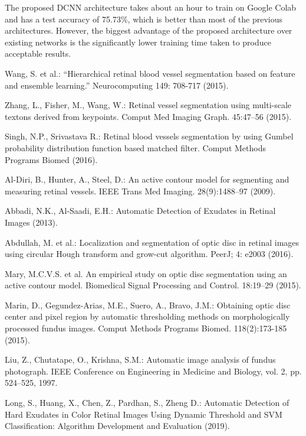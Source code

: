 \documentclass{svproc}
\begin{document}
The proposed DCNN architecture takes about an hour to train on Google Colab and has a test accuracy of 75.73\%, which is better than most of the previous architectures. However, the biggest advantage of the proposed architecture over existing networks is the significantly lower training time taken to produce acceptable results.


\begin{thebibliography}{6}


Wang, S. et al.: “Hierarchical retinal blood vessel segmentation based on feature and ensemble learning.” Neurocomputing 149: 708-717 (2015).

Zhang, L., Fisher, M., Wang, W.: Retinal vessel segmentation using multi-scale textons derived from keypoints. Comput Med Imaging Graph. 45:47–56 (2015).

Singh, N.P., Srivastava R.: Retinal blood vessels segmentation by using Gumbel probability distribution function based matched filter. Comput Methods Programs Biomed (2016).

Al-Diri, B., Hunter, A., Steel, D.: An active contour model for segmenting and measuring retinal vessels. IEEE Trans Med Imaging. 28(9):1488–97 (2009).

Abbadi, N.K., Al-Saadi, E.H.: Automatic Detection of Exudates in Retinal Images (2013).

Abdullah, M. et al.: Localization and segmentation of optic disc in retinal images using circular Hough transform and grow-cut algorithm. PeerJ; 4: e2003 (2016).

Mary, M.C.V.S. et al. An empirical study on optic disc segmentation using an active contour model. Biomedical Signal Processing and Control. 18:19–29 (2015).

Marin, D., Gegundez-Arias, M.E., Suero, A., Bravo, J.M.: Obtaining optic disc center and pixel region by automatic thresholding methods on morphologically processed fundus images. Comput Methods Programs Biomed. 118(2):173-185 (2015).

Liu, Z., Chutatape, O., Krishna, S.M.: Automatic image analysis of fundus photograph. IEEE Conference on Engineering in Medicine and Biology, vol. 2, pp. 524–525, 1997.

Long, S., Huang, X., Chen, Z., Pardhan, S., Zheng D.: Automatic Detection of Hard Exudates in Color Retinal Images Using Dynamic Threshold and SVM Classification: Algorithm Development and Evaluation (2019).


\end{thebibliography}
\end{document}
